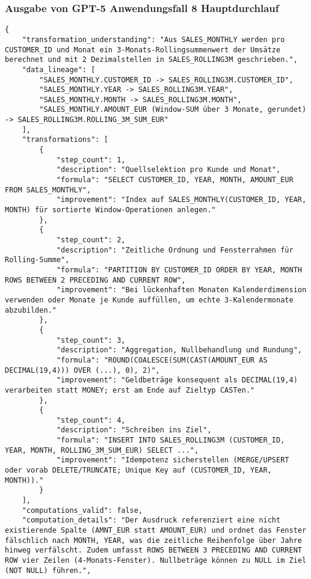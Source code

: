 \subsubsection{Ausgabe von GPT-5 Anwendungsfall 8 Hauptdurchlauf}\label{anhang:subsubsec:gpt_case8_prompt1}
\begin{lstlisting}[caption={Ausgabe: GPT-5 Anwendungsfall 8 Hauptdurchlauf},label={gpt_case8_prompt1}]
{
    "transformation_understanding": "Aus SALES_MONTHLY werden pro CUSTOMER_ID und Monat ein 3-Monats-Rollingsummenwert der Umsätze berechnet und mit 2 Dezimalstellen in SALES_ROLLING3M geschrieben.",
    "data_lineage": [
        "SALES_MONTHLY.CUSTOMER_ID -> SALES_ROLLING3M.CUSTOMER_ID",
        "SALES_MONTHLY.YEAR -> SALES_ROLLING3M.YEAR",
        "SALES_MONTHLY.MONTH -> SALES_ROLLING3M.MONTH",
        "SALES_MONTHLY.AMOUNT_EUR (Window-SUM über 3 Monate, gerundet) -> SALES_ROLLING3M.ROLLING_3M_SUM_EUR"
    ],
    "transformations": [
        {
            "step_count": 1,
            "description": "Quellselektion pro Kunde und Monat",
            "formula": "SELECT CUSTOMER_ID, YEAR, MONTH, AMOUNT_EUR FROM SALES_MONTHLY",
            "improvement": "Index auf SALES_MONTHLY(CUSTOMER_ID, YEAR, MONTH) für sortierte Window-Operationen anlegen."
        },
        {
            "step_count": 2,
            "description": "Zeitliche Ordnung und Fensterrahmen für Rolling-Summe",
            "formula": "PARTITION BY CUSTOMER_ID ORDER BY YEAR, MONTH ROWS BETWEEN 2 PRECEDING AND CURRENT ROW",
            "improvement": "Bei lückenhaften Monaten Kalenderdimension verwenden oder Monate je Kunde auffüllen, um echte 3-Kalendermonate abzubilden."
        },
        {
            "step_count": 3,
            "description": "Aggregation, Nullbehandlung und Rundung",
            "formula": "ROUND(COALESCE(SUM(CAST(AMOUNT_EUR AS DECIMAL(19,4))) OVER (...), 0), 2)",
            "improvement": "Geldbeträge konsequent als DECIMAL(19,4) verarbeiten statt MONEY; erst am Ende auf Zieltyp CASTen."
        },
        {
            "step_count": 4,
            "description": "Schreiben ins Ziel",
            "formula": "INSERT INTO SALES_ROLLING3M (CUSTOMER_ID, YEAR, MONTH, ROLLING_3M_SUM_EUR) SELECT ...",
            "improvement": "Idempotenz sicherstellen (MERGE/UPSERT oder vorab DELETE/TRUNCATE; Unique Key auf (CUSTOMER_ID, YEAR, MONTH))."
        }
    ],
    "computations_valid": false,
    "computation_details": "Der Ausdruck referenziert eine nicht existierende Spalte (AMNT_EUR statt AMOUNT_EUR) und ordnet das Fenster fälschlich nach MONTH, YEAR, was die zeitliche Reihenfolge über Jahre hinweg verfälscht. Zudem umfasst ROWS BETWEEN 3 PRECEDING AND CURRENT ROW vier Zeilen (4-Monats-Fenster). Nullbeträge können zu NULL im Ziel (NOT NULL) führen.",

\end{lstlisting}

